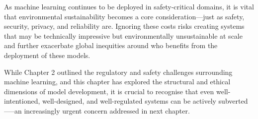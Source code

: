 As machine learning continues to be deployed in safety-critical domains, it is vital that environmental sustainability becomes a core consideration—just as safety, security, privacy, and reliability are. 
Ignoring these costs risks creating systems that may be technically impressive but environmentally unsustainable at scale and further exacerbate global inequities around who benefits from the deployment of these models.

While Chapter 2 outlined the regulatory and safety challenges surrounding machine learning, and this chapter has explored the structural and ethical dimensions of model development, it is crucial to recognise that even well-intentioned, well-designed, and well-regulated systems can be actively subverted—--an increasingly urgent concern addressed in next chapter.